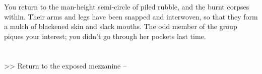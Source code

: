 You return to the man-height semi-circle of piled rubble, and the burnt corpses within. Their arms and legs have been snapped and interwoven, so that they form a mulch of blackened skin and slack mouths. The odd member of the group piques your interest; you didn't go through her pockets last time.\\
\\
\\

>> Return to the exposed mezzanine -- 